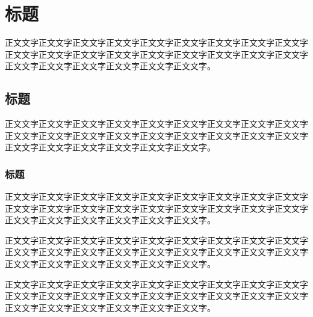 

\chapter{标题}

正文文字正文文字正文文字正文文字正文文字正文文字正文文字正文文字正文文字正文文字正文文字正文文字正文文字正文文字正文文字正文文字正文文字正文文字正文文字正文文字正文文字正文文字正文文字正文文字。

\section{标题}

正文文字正文文字正文文字正文文字正文文字正文文字正文文字正文文字正文文字正文文字正文文字正文文字正文文字正文文字正文文字正文文字正文文字正文文字正文文字正文文字正文文字正文文字正文文字正文文字。

\subsection{标题}

正文文字正文文字正文文字正文文字正文文字正文文字正文文字正文文字正文文字正文文字正文文字正文文字正文文字正文文字正文文字正文文字正文文字正文文字正文文字正文文字正文文字正文文字正文文字正文文字。

正文文字正文文字正文文字正文文字正文文字正文文字正文文字正文文字正文文字正文文字正文文字正文文字正文文字正文文字正文文字正文文字正文文字正文文字正文文字正文文字正文文字正文文字正文文字正文文字。

正文文字正文文字正文文字正文文字正文文字正文文字正文文字正文文字正文文字正文文字正文文字正文文字正文文字正文文字正文文字正文文字正文文字正文文字正文文字正文文字正文文字正文文字正文文字正文文字。

